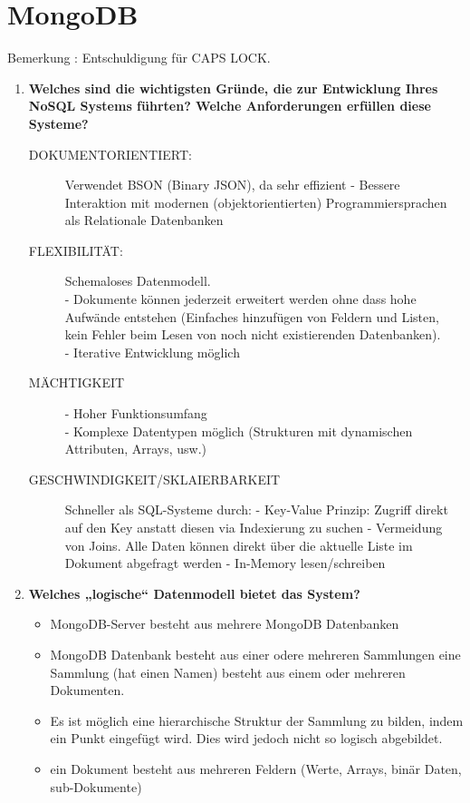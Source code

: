 \documentclass[a4paper,10pt,titlepage=false]{scrreprt}
\begin{document}
\section{MongoDB} %
Bemerkung : Entschuldigung für CAPS LOCK.
\label{sec:mongodb}
\begin{enumerate}
  \item \textbf{Welches sind die wichtigsten Gründe, die zur Entwicklung Ihres NoSQL Systems führten? Welche Anforderungen erfüllen diese Systeme?}\\
  \begin{description}
    \item[DOKUMENTORIENTIERT:] Verwendet BSON (Binary JSON), da sehr effizient
   - Bessere Interaktion mit modernen (objektorientierten) Programmiersprachen als Relationale Datenbanken
   \item[FLEXIBILITÄT:]  Schemaloses Datenmodell.\\
   - Dokumente können jederzeit erweitert werden ohne dass hohe Aufwände entstehen (Einfaches hinzufügen von Feldern und Listen, kein Fehler beim Lesen von noch nicht existierenden Datenbanken).\\
   - Iterative Entwicklung möglich \\
   \item[MÄCHTIGKEIT] - Hoher Funktionsumfang\\
   - Komplexe Datentypen möglich (Strukturen mit dynamischen Attributen, Arrays, usw.)
   \item[GESCHWINDIGKEIT/SKLAIERBARKEIT]    Schneller als SQL-Systeme durch:
   - Key-Value Prinzip: Zugriff direkt auf den Key anstatt diesen via Indexierung zu suchen
   - Vermeidung von Joins. Alle Daten können direkt über die aktuelle Liste im Dokument abgefragt werden
   - In-Memory lesen/schreiben
  \end{description}
  \item \textbf{Welches „logische“ Datenmodell bietet das System?} \hfill  \\
  \begin{itemize}
    \item MongoDB-Server besteht  aus mehrere MongoDB Datenbanken
\item MongoDB Datenbank besteht aus einer odere mehreren Sammlungen
eine Sammlung (hat einen Namen) besteht aus einem oder mehreren Dokumenten.
\item Es ist möglich eine hierarchische Struktur der Sammlung zu bilden, indem ein Punkt eingefügt wird. Dies wird jedoch nicht so logisch abgebildet.
\item ein Dokument besteht aus mehreren Feldern (Werte, Arrays, binär Daten, sub-Dokumente)

\end{itemize}
\end{enumerate}
\end{document}
